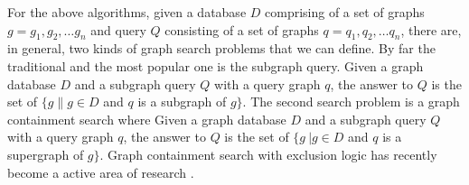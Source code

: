 For the above algorithms, given a database $D$ comprising of a set of graphs $g=g_1 ,g_2 ,\ldots g_n$ and query $Q$ consisting of a set of graphs 
$q=q_1 ,q_2 ,\ldots q_n$, there are, in general, two kinds of graph search problems that we can define. By far the traditional and the most popular 
one is the subgraph query. Given a graph database $D$ and a subgraph query $Q$ with  a query graph $q$, the answer to $Q$ is the set of $\{g \| g\in D$ 
and $q$ is a subgraph of $g\} $. The second search problem is a graph containment search where Given a graph database $D$ and a subgraph query $Q$ with  
a query graph $q$, the answer to $Q$ is the set of $\{g\ | g\in D$ and $q$ is a supergraph of $g\}$. Graph containment search with exclusion logic has 
recently become a  active area of research \cite{chen2007_cindex} \cite{zhang_gao_wu2011}.  
 

